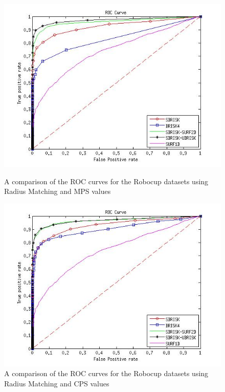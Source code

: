 \documentclass{report}
\begin{document}
\begin{figure}[h!]
\begin{minipage}[b]{0.5\linewidth}
\includegraphics[scale=0.4]{../Drawings/RobocupDataset/ROC_General_Hamming_max.jpg}
\caption{A comparison of the ROC curves for the Robocup datasets using Radius Matching and MPS values}
\label{fig:compareHamming}
\end{minipage}
\hspace{0.5cm}
\begin{minipage}[b]{0.5\linewidth}
\includegraphics[scale=0.4]{../Drawings/RobocupDataset/ROC_General_Hamming_consistent.jpg}
\caption{A comparison of the ROC curves for the Robocup datasets using Radius Matching and CPS values}
\label{fig:compareHammingConsistent}

\end{minipage}
\end{figure}
\end{document}
